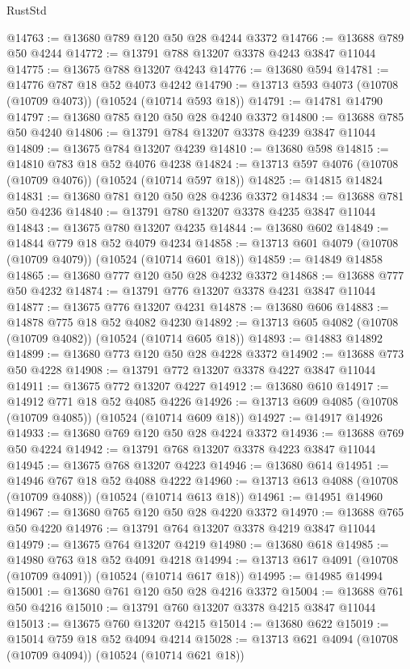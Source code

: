 \begin{lexlean}{RustStd}
\begin{coremodule}
@14763 := @13680 @789 @120 @50 @28 @4244 @3372
@14766 := @13688 @789 @50 @4244
@14772 := @13791 @788 @13207 @3378 @4243 @3847 @11044
@14775 := @13675 @788 @13207 @4243
@14776 := @13680 @594
@14781 := @14776 @787 @18 @52 @4073 @4242
@14790 := @13713 @593 @4073 (@10708 (@10709 @4073)) (@10524 (@10714 @593 @18))
@14791 := @14781 @14790
@14797 := @13680 @785 @120 @50 @28 @4240 @3372
@14800 := @13688 @785 @50 @4240
@14806 := @13791 @784 @13207 @3378 @4239 @3847 @11044
@14809 := @13675 @784 @13207 @4239
@14810 := @13680 @598
@14815 := @14810 @783 @18 @52 @4076 @4238
@14824 := @13713 @597 @4076 (@10708 (@10709 @4076)) (@10524 (@10714 @597 @18))
@14825 := @14815 @14824
@14831 := @13680 @781 @120 @50 @28 @4236 @3372
@14834 := @13688 @781 @50 @4236
@14840 := @13791 @780 @13207 @3378 @4235 @3847 @11044
@14843 := @13675 @780 @13207 @4235
@14844 := @13680 @602
@14849 := @14844 @779 @18 @52 @4079 @4234
@14858 := @13713 @601 @4079 (@10708 (@10709 @4079)) (@10524 (@10714 @601 @18))
@14859 := @14849 @14858
@14865 := @13680 @777 @120 @50 @28 @4232 @3372
@14868 := @13688 @777 @50 @4232
@14874 := @13791 @776 @13207 @3378 @4231 @3847 @11044
@14877 := @13675 @776 @13207 @4231
@14878 := @13680 @606
@14883 := @14878 @775 @18 @52 @4082 @4230
@14892 := @13713 @605 @4082 (@10708 (@10709 @4082)) (@10524 (@10714 @605 @18))
@14893 := @14883 @14892
@14899 := @13680 @773 @120 @50 @28 @4228 @3372
@14902 := @13688 @773 @50 @4228
@14908 := @13791 @772 @13207 @3378 @4227 @3847 @11044
@14911 := @13675 @772 @13207 @4227
@14912 := @13680 @610
@14917 := @14912 @771 @18 @52 @4085 @4226
@14926 := @13713 @609 @4085 (@10708 (@10709 @4085)) (@10524 (@10714 @609 @18))
@14927 := @14917 @14926
@14933 := @13680 @769 @120 @50 @28 @4224 @3372
@14936 := @13688 @769 @50 @4224
@14942 := @13791 @768 @13207 @3378 @4223 @3847 @11044
@14945 := @13675 @768 @13207 @4223
@14946 := @13680 @614
@14951 := @14946 @767 @18 @52 @4088 @4222
@14960 := @13713 @613 @4088 (@10708 (@10709 @4088)) (@10524 (@10714 @613 @18))
@14961 := @14951 @14960
@14967 := @13680 @765 @120 @50 @28 @4220 @3372
@14970 := @13688 @765 @50 @4220
@14976 := @13791 @764 @13207 @3378 @4219 @3847 @11044
@14979 := @13675 @764 @13207 @4219
@14980 := @13680 @618
@14985 := @14980 @763 @18 @52 @4091 @4218
@14994 := @13713 @617 @4091 (@10708 (@10709 @4091)) (@10524 (@10714 @617 @18))
@14995 := @14985 @14994
@15001 := @13680 @761 @120 @50 @28 @4216 @3372
@15004 := @13688 @761 @50 @4216
@15010 := @13791 @760 @13207 @3378 @4215 @3847 @11044
@15013 := @13675 @760 @13207 @4215
@15014 := @13680 @622
@15019 := @15014 @759 @18 @52 @4094 @4214
@15028 := @13713 @621 @4094 (@10708 (@10709 @4094)) (@10524 (@10714 @621 @18))

\end{coremodule}
\end{lexlean}
